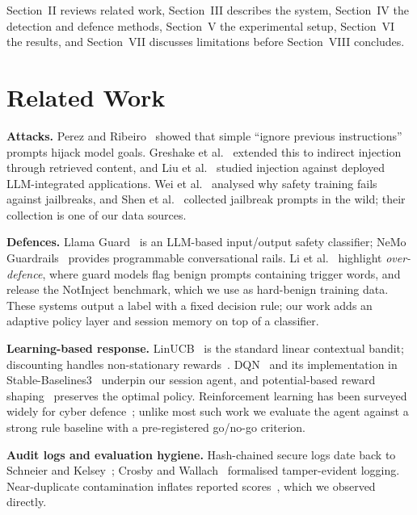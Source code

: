 \documentclass[conference]{IEEEtran}
\begin{document}
Section~II reviews related work, Section~III describes the system,
Section~IV the detection and defence methods, Section~V the experimental
setup, Section~VI the results, and Section~VII discusses limitations
before Section~VIII concludes.

\section{Related Work}

\textbf{Attacks.} Perez and Ribeiro~\cite{perez2022ignore} showed that
simple ``ignore previous instructions'' prompts hijack model goals.
Greshake et al.~\cite{greshake2023not} extended this to indirect injection
through retrieved content, and Liu et al.~\cite{liu2023prompt} studied
injection against deployed LLM-integrated applications. Wei et
al.~\cite{wei2023jailbroken} analysed why safety training fails against
jailbreaks, and Shen et al.~\cite{shen2024dan} collected jailbreak prompts
in the wild; their collection is one of our data sources.

\textbf{Defences.} Llama Guard~\cite{inan2023llamaguard} is an LLM-based
input/output safety classifier; NeMo Guardrails~\cite{rebedea2023nemo}
provides programmable conversational rails. Li et
al.~\cite{li2024injecguard} highlight \emph{over-defence}, where guard
models flag benign prompts containing trigger words, and release the
NotInject benchmark, which we use as hard-benign training data. These
systems output a label with a fixed decision rule; our work adds an
adaptive policy layer and session memory on top of a classifier.

\textbf{Learning-based response.} LinUCB~\cite{li2010contextual} is the
standard linear contextual bandit; discounting handles non-stationary
rewards~\cite{garivier2011switching}. DQN~\cite{mnih2015human} and its
implementation in Stable-Baselines3~\cite{raffin2021sb3} underpin our
session agent, and potential-based reward shaping~\cite{ng1999policy}
preserves the optimal policy. Reinforcement learning has been surveyed
widely for cyber defence~\cite{nguyen2021drl}; unlike most such work we
evaluate the agent against a strong rule baseline with a pre-registered
go/no-go criterion.

\textbf{Audit logs and evaluation hygiene.} Hash-chained secure logs date
back to Schneier and Kelsey~\cite{schneier1999secure}; Crosby and
Wallach~\cite{crosby2009efficient} formalised tamper-evident logging.
Near-duplicate contamination inflates reported scores~\cite{lee2022dedup},
which we observed directly.
\end{document}
